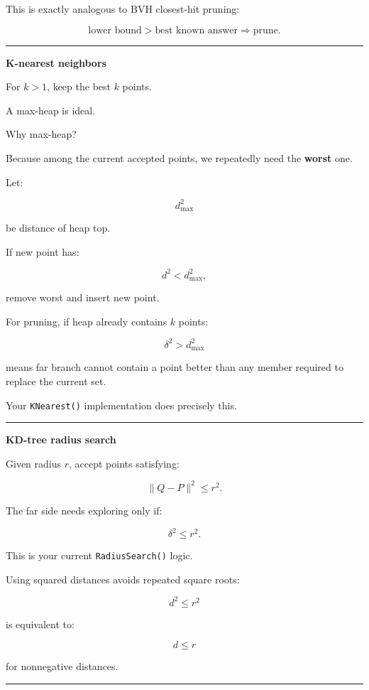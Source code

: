 This is exactly analogous to BVH closest-hit pruning:

\[
\text{lower bound}>
\text{best known answer}
\Rightarrow
\text{prune}.
\]

\begin{center}\rule{0.5\linewidth}{0.5pt}\end{center}

\textbf{K-nearest neighbors}

For \(k>1\), keep the best \(k\) points.

A max-heap is ideal.

Why max-heap?

Because among the current accepted points, we repeatedly need the \textbf{worst} one.

Let:

\[
d^2_{\max}
\]

be distance of heap top.

If new point has:

\[
d^2<d^2_{\max},
\]

remove worst and insert new point.

For pruning, if heap already contains \(k\) points:

\[
\delta^2>
d^2_{\max}
\]

means far branch cannot contain a point better than any member required to replace the current set.

Your \texttt{KNearest()} implementation does precisely this.

\begin{center}\rule{0.5\linewidth}{0.5pt}\end{center}

\textbf{KD-tree radius search}

Given radius \(r\), accept points satisfying:

\[
\|Q-P\|^2\le r^2.
\]

The far side needs exploring only if:

\[
\delta^2\le r^2.
\]

This is your current \texttt{RadiusSearch()} logic.

Using squared distances avoids repeated square roots:

\[
d^2\le r^2
\]

is equivalent to:

\[
d\le r
\]

for nonnegative distances.

\begin{center}\rule{0.5\linewidth}{0.5pt}\end{center}

